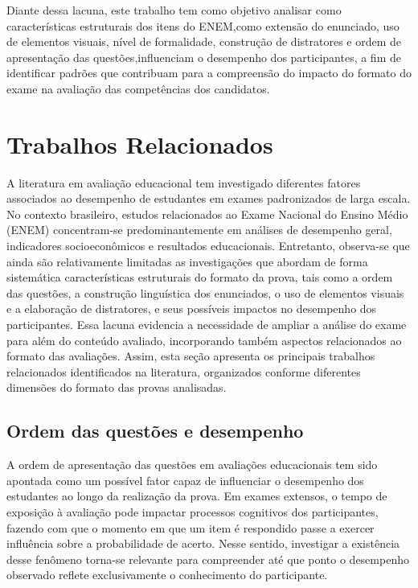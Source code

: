 \documentclass[a4paper,10pt, twocolumn]{article}
\begin{document}
Diante dessa lacuna, este trabalho tem como objetivo analisar como características estruturais dos itens do ENEM,como extensão do enunciado, uso de elementos visuais, nível de formalidade, construção de distratores e ordem de apresentação das questões,influenciam o desempenho dos participantes, a fim de identificar padrões que contribuam para a compreensão do impacto do formato do exame na avaliação das competências dos candidatos.
\section{Trabalhos Relacionados}

A literatura em avaliação educacional tem investigado diferentes fatores associados ao desempenho de estudantes em exames padronizados de larga escala. No contexto brasileiro, estudos relacionados ao Exame Nacional do Ensino Médio (ENEM) concentram-se predominantemente em análises de desempenho geral, indicadores socioeconômicos e resultados educacionais. Entretanto, observa-se que ainda são relativamente limitadas as investigações que abordam de forma sistemática características estruturais do formato da prova, tais como a ordem das questões, a construção linguística dos enunciados, o uso de elementos visuais e a elaboração de distratores, e seus possíveis impactos no desempenho dos participantes. Essa lacuna evidencia a necessidade de ampliar a análise do exame para além do conteúdo avaliado, incorporando também aspectos relacionados ao formato das avaliações. Assim, esta seção apresenta os principais trabalhos relacionados identificados na literatura, organizados conforme diferentes dimensões do formato das provas analisadas.

\subsection{Ordem das questões e desempenho}

A ordem de apresentação das questões em avaliações educacionais tem sido apontada como um possível fator capaz de influenciar o desempenho dos estudantes ao longo da realização da prova. Em exames extensos, o tempo de exposição à avaliação pode impactar processos cognitivos dos participantes, fazendo com que o momento em que um item é respondido passe a exercer influência sobre a probabilidade de acerto. Nesse sentido, investigar a existência desse fenômeno torna-se relevante para compreender até que ponto o desempenho observado reflete exclusivamente o conhecimento do participante.
\end{document}
